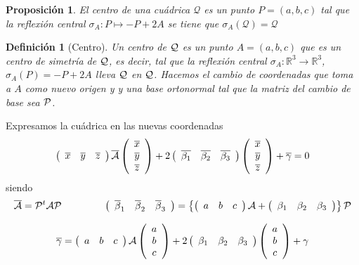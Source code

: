 \documentclass[11pt, a4paper]{article}
\newif\IfInSansMode
\theoremstyle{theorem-style}
\newtheorem{nprop}{Proposición}[section]
\theoremstyle{definition-style}
\newtheorem{ndef}{Definición}[section]
\theoremstyle{remark-style}
\theoremstyle{example-style}
\begin{document}
\begin{nprop}
	El centro de una cuádrica $\mathcal Q$ es un punto $P=(a,b,c)$ tal que la reflexión central $\sigma_A: P \mapsto -P+2A$ se tiene que $\sigma_A (\mathcal Q) = \mathcal Q$
\end{nprop}


\begin{ndef}[Centro]
	Un {\it centro} de $\cal Q$ es un punto $A=(a,b,c)$ que es un centro de simetr\'ia de $\cal Q$, es decir, tal que la reflexi\'on central $\sigma_A:\mathbb{R}^3\longrightarrow\mathbb{R}^3$, $\sigma_A(P)= -P+2A$ lleva  $\cal Q$ en $\cal Q$. Hacemos el cambio de coordenadas que toma a $A$ como nuevo origen y 
y una base ortonormal tal que la matriz del cambio de base sea $\cal P$.
\end{ndef}


Expresamos la cu\'adrica en las nuevas coordenadas
\[ 
\left( \begin{array}{ccc} 
\overline{x} & \overline{y} & \overline{z}   
 \end{array} \right)\overline{{\cal A}}
\left(\begin{array}{c}
\overline{x} \\
\overline{y} \\
\overline{z}  
\end{array} \right)
+
2
 \left( \begin{array}{ccc}
\overline{\beta_1} & \overline{\beta_2} & \overline{\beta_3}   
 \end{array} \right)
\left( \begin{array}{c}
\overline{x} \\
\overline{y} \\
\overline{z}  
 \end{array} \right)
+ \overline{\gamma} = 0
\]
siendo
\[
\overline{{\cal A}} = {\cal P}^t{\cal A}{\cal P} \hspace{1.5cm}
\left( \begin{array}{ccc}
\overline{\beta}_1 & \overline{\beta}_2 & \overline{\beta}_3   
 \end{array} \right) = 
  \left\{
\left( \begin{array}{ccc} 
a &  b &  c 
 \end{array} \right){\cal A} +
 \left( \begin{array}{ccc}
\beta_1 & \beta_2 & \beta_3   
 \end{array} \right) \right\}
{\cal P}
\]


\[
 \overline{\gamma} = \left( \begin{array}{ccc} 
a &  b & c 
 \end{array} \right){\cal A}
\left(\begin{array}{c}
a  \\
b \\
c  
\end{array} \right)  + 
2 \left( \begin{array}{ccc}
\beta_1 & \beta_2 & \beta_3   
 \end{array} \right)
\left( \begin{array}{c}
a \\
b \\
c  
 \end{array} \right)
+ \gamma
\]
\end{document}
